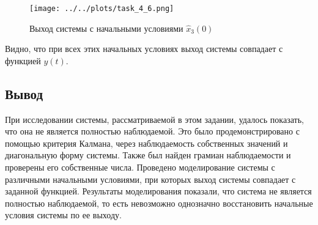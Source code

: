 \begin{figure}[ht!]
    \centering
    \texttt{[image: ../../plots/task\_4\_6.png]}
    \caption{Выход системы с начальными условиями $\hat{x}_3(0)$}
    \label{fig:task4_output__hat_3}
\end{figure}

Видно, что при всех этих начальных условиях выход системы совпадает с функцией $y(t)$.

\subsection{Вывод}
При исследовании системы, рассматриваемой в этом задании, удалось показать, что она не является полностью наблюдаемой.
Это было продемонстрировано с помощью критерия Калмана, через наблюдаемость собственных значений и диагональную форму системы. 
Также был найден грамиан наблюдаемости и проверены его собственные числа. 
Проведено моделирование системы с различными начальными условиями, при которых выход системы совпадает с заданной функцией. 
Результаты моделирования показали, что система не является полностью наблюдаемой, то есть 
невозможно однозначно восстановить начальные условия системы по ее выходу.